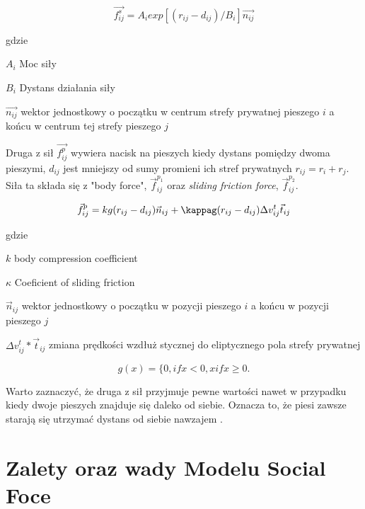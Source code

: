 \begin{equation}
\vec{f_{ij}^{s}} = A_{i} exp[(r_{ij} - d_{ij}) / B_{i}]\vec{n_{ij}}
\end{equation}

gdzie
\begin{eqwhere}[2cm]
	\item[$A_{i}$] Moc siły
	\item[$B_{i}$] Dystans działania siły
	\item[$\vec{n_{ij}}$] wektor jednostkowy o początku w centrum strefy prywatnej pieszego $i$ a końcu w centrum tej strefy pieszego $j$
\end{eqwhere}

Druga z sił $\vec{f_{ij}^{p}}$ wywiera nacisk na pieszych kiedy dystans pomiędzy dwoma pieszymi, $d_{ij}$ jest mniejszy od sumy promieni ich stref prywatnych $r_{ij} = r_{i} + r_{j}$. Siła ta składa się z "body force", $\vec{f} _{ij}^{p_{1}}$ oraz \textit{sliding friction force}, $\vec{f} _{ij}^{p_{2}}$.

\begin{equation}
\vec{f}_{ij}^{p} = kg(r_{ij} - d_{ij}) \vec{n}_{ij} + \kappag (r_{ij} - d_{ij}) \Delta v _{ij}^{t} \vec{t}_{ij}
\end{equation}

gdzie
\begin{eqwhere}[2cm]
	\item[$k$] body compression coefficient
	\item[$\kappa$] Coeficient of sliding friction
	\item[$\vec{n}_{ij}$] wektor jednostkowy o początku w pozycji pieszego $i$ a końcu w pozycji pieszego $j$
	\item[$\Delta v_{ij}^{t} * \vec{t}_{ij}$] zmiana prędkości wzdłuż stycznej do eliptycznego pola strefy prywatnej
\end{eqwhere}

\begin{equation}
g(x) = \lbrace {0, if x < 0, x if x \geq 0.}
\end{equation}

Warto zaznaczyć, że druga z sił przyjmuje pewne wartości nawet w przypadku kiedy dwoje pieszych znajduje się daleko od siebie. Oznacza to, że piesi zawsze starają się utrzymać dystans od siebie nawzajem \cite{relativeVelocity}.


\section{Zalety oraz wady Modelu Social Foce}

